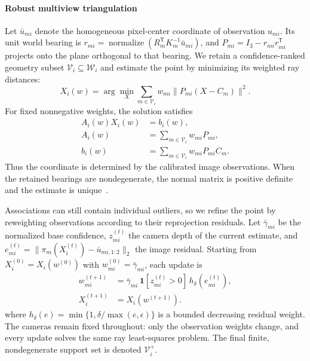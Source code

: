 \paragraph{Robust multiview triangulation}
Let $\bar u_{mi}$ denote the homogeneous pixel-center coordinate of observation $u_{mi}$. Its unit world bearing is
$r_{mi}=\operatorname{normalize}(R_m^\mathsf TK_m^{-1}\bar u_{mi})$,
and $P_{mi}=I_3-r_{mi}r_{mi}^\mathsf T$ projects onto the plane orthogonal to that bearing. We retain a confidence-ranked geometry subset $\mathcal V_i\subseteq\mathcal W_i$ and estimate the point by minimizing its weighted ray distances:
\begin{equation}
X_i(w)=\arg\min_X\sum_{m\in\mathcal V_i}w_{mi}\lVert P_{mi}(X-C_m)\rVert^2.
\label{eq:triangulation}
\end{equation}
For fixed nonnegative weights, the solution satisfies
\begin{equation}
\begin{aligned}
A_i(w)X_i(w)&=b_i(w),\\
A_i(w)&=\sum_{m\in\mathcal V_i}w_{mi}P_{mi},\\
b_i(w)&=\sum_{m\in\mathcal V_i}w_{mi}P_{mi}C_m.
\end{aligned}
\label{eq:raynormal}
\end{equation}
Thus the coordinate is determined by the calibrated image observations. When the retained bearings are nondegenerate, the normal matrix is positive definite and the estimate is unique~\cite{hartley2004mvg}.

Associations can still contain individual outliers, so we refine the point by reweighting observations according to their reprojection residuals. Let $\bar\gamma_{mi}$ be the normalized base confidence, $z_{mi}^{(t)}$ the camera depth of the current estimate, and $e_{mi}^{(t)}=\lVert\pi_m(X_i^{(t)})-\bar u_{mi,1:2}\rVert_2$ the image residual. Starting from $X_i^{(0)}=X_i(w^{(0)})$ with $w_{mi}^{(0)}=\bar\gamma_{mi}$, each update is
\begin{equation}
\begin{aligned}
w_{mi}^{(t+1)}&=\bar\gamma_{mi}\,\mathbf 1[z_{mi}^{(t)}>0]\,
h_\delta(e_{mi}^{(t)}),\\
X_i^{(t+1)}&=X_i(w^{(t+1)}).
\end{aligned}
\label{eq:rayreweight}
\end{equation}
where $h_\delta(e)=\min\{1,\delta/\max(e,\epsilon)\}$ is a bounded decreasing residual weight. The cameras remain fixed throughout: only the observation weights change, and every update solves the same ray least-squares problem. The final finite, nondegenerate support set is denoted $\mathcal V_i^+$.

